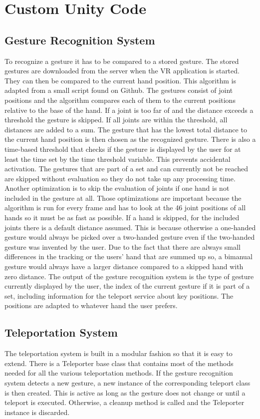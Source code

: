 \chapter{Custom Unity Code}

\section{Gesture Recognition System}
To recognize a gesture it has to be compared to a stored gesture. The stored gestures are downloaded from the server when the VR application is started. They can then be compared to the current hand position. This algorithm is adapted from a small script found on Github.  %
The gestures consist of joint positions and the algorithm compares each of them to the current positions relative to the base of the hand. If a joint is too far of and the distance exceeds a threshold the gesture is skipped. If all joints are within the threshold, all distances are added to a sum. The gesture that has the lowest total distance to the current hand position is then chosen as the recognized gesture. There is also a time-based threshold that checks if the gesture is displayed by the user for at least the time set by the time threshold variable. This prevents accidental activation. The gestures that are part of a set and can currently not be reached are skipped without evaluation so they do not take up any processing time. Another optimization is to skip the evaluation of joints if one hand is not included in the gesture at all. Those optimizations are important because the algorithm is run for every frame and has to look at the 46 joint positions of all hands so it must be as fast as possible.
If a hand is skipped, for the included joints there is a default distance assumed. This is because otherwise a one-handed gesture would always be picked over a two-handed gesture even if the two-handed gesture was invented by the user. Due to the fact that there are always small differences in the tracking or the users' hand that are summed up so, a bimanual gesture would always have a larger distance compared to a skipped hand with zero distance. 
The output of the gesture recognition system is the type of gesture currently displayed by the user, the index of the current gesture if it is part of a set, including information for the teleport service about key positions. The positions are adapted to whatever hand the user prefers.

\section{Teleportation System}
The teleportation system is built in a modular fashion so that it is easy to extend. There is a Teleporter base class that contains most of the methods needed for all the various teleportation methods. If the gesture recognition system detects a new gesture, a new instance of the corresponding teleport class is then created. This is active as long as the gesture does not change or until a teleport is executed. Otherwise, a cleanup method is called and the Teleporter instance is discarded. 

